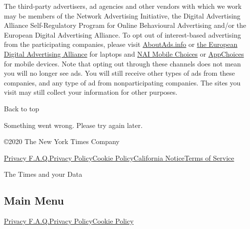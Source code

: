 The third-party advertisers, ad agencies and other vendors with which we
work may be members of the Network Advertising Initiative, the Digital
Advertising Alliance Self-Regulatory Program for Online Behavioural
Advertising and/or the European Digital Advertising Alliance. To opt out
of interest-based advertising from the participating companies, please
visit \href{http://optout.aboutads.info/?c=2\&lang=EN}{AboutAds.info} or
\href{http://www.youronlinechoices.eu/}{the European Digital Advertising
Alliance} for laptops and
\href{https://www.networkadvertising.org/mobile-choice/}{NAI Mobile
Choices} or \href{https://youradchoices.com/appchoices}{AppChoices} for
mobile devices. Note that opting out through these channels does not
mean you will no longer see ads. You will still receive other types of
ads from these companies, and any type of ad from nonparticipating
companies. The sites you visit may still collect your information for
other purposes.

Back to top

Something went wrong. Please try again later.

©2020 The New York Times Company

\href{/privacy}{Privacy F.A.Q.}\href{/privacy/privacy-policy}{Privacy
Policy}\href{/privacy/cookie-policy}{Cookie
Policy}\href{/privacy/california-notice}{California
Notice}\href{https://help.nytimes3xbfgragh.onion/hc/en-us/articles/115014893428-Terms-of-service}{Terms
of Service}

The Times and your Data

\hypertarget{main-menu}{%
\subsection{Main Menu}\label{main-menu}}

\href{/privacy}{Privacy F.A.Q.}\href{/privacy/privacy-policy}{Privacy
Policy}\href{/privacy/cookie-policy}{Cookie Policy}
